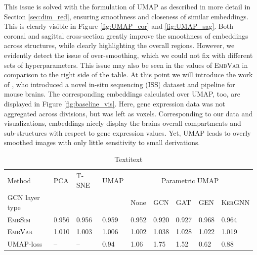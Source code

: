 \documentclass[]{article}
\begin{document}
This issue is solved with the formulation of UMAP as described in more detail in Section \ref{sec:dim_red}, ensuring smoothness and closeness of similar embeddings. This is clearly visible in Figure \ref{fig:UMAP_cor} and \ref{fig:UMAP_sag}. Both coronal and sagittal cross-section greatly improve the smoothness of embeddings across structures, while clearly highlighting the overall regions. However, we evidently detect the issue of over-smoothing, which we could not fix with different sets of hyperparameters. This issue may also be seen in the values of \textsc{EmbVar} in comparison to the right side of the table.
At this point we will introduce the work of \citet{Partel2020}, who introduced a novel in-situ sequencing (ISS) dataset and pipeline for mouse brains. The corresponding embeddings calculated over UMAP, too, are displayed in Figure \ref{fig:baseline_vis}. Here, gene expression data was not aggregated across divisions, but was left as voxels. Corresponding to our data and visualizations, embeddings nicely display the brains overall compartments and sub-structures with respect to gene expression values. Yet, UMAP leads to overly smoothed images with only little sensitivity to small derivations. \\


\begin{table}
	\centering
	\renewcommand{\arraystretch}{1.2}
	
	\begin{tabular}{|l|l|l|l|l|l|l|l|l|}
		\hline
		Method&PCA&T-SNE&UMAP&\multicolumn{5}{c|}{Parametric UMAP}\\
		GCN layer type &&&&None&\textsc{GCN}&\textsc{GAT}&\textsc{GEN}&\textsc{KerGNN}\\
		\hline
		\textsc{EmbSim}&0.956&0.956&0.959&0.952&0.920&0.927&0.968&0.964\\
		
		\textsc{EmbVar}&1.010&1.003&1.006&1.002&1.038&1.028&1.022&1.019\\
		\hline
		UMAP-loss&--&--&0.94&1.06&1.75&1.52&0.62&0.88\\
		\hline
	\end{tabular}

	\caption{Textitext}
	\label{tab:dim_red_GCN}
\end{table}
\end{document}

